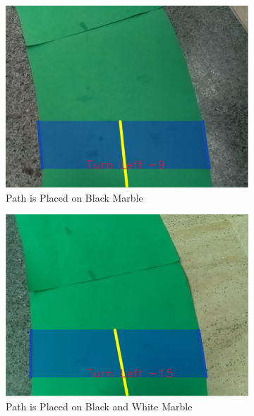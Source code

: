 \documentclass[a4paper,12pt]{article}
\begin{document}
	\begin{figure}[H]
	\setlength{\unitlength}{\textwidth} 
	\centering
	\begin{subfigure}{.31\textwidth}
		\centering
		\includegraphics[width=0.30\unitlength]{images/path_images/inside-bb}
		\caption{\label{fig:dataP_inside-bb} Path is Placed on Black Marble}
	\end{subfigure}%
	\begin{subfigure}{.31\textwidth}
		\centering
		\includegraphics[width=0.30\unitlength]{images/path_images/inside-bw}
		\caption{\label{fig:dataP_inside-bw} Path is Placed on Black and White Marble}
	\end{subfigure}
		\begin{subfigure}{.31\textwidth}

\end{subfigure}
\end{figure}
\end{document}
